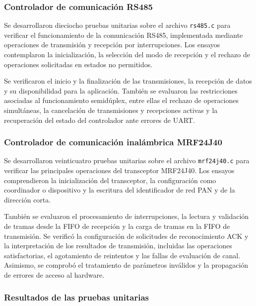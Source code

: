 \subsubsection{Controlador de comunicación RS485}

Se desarrollaron dieciocho pruebas unitarias sobre el archivo \texttt{rs485.c} para verificar el funcionamiento de la comunicación RS485, implementada mediante operaciones de transmisión y recepción por interrupciones. Los ensayos contemplaron la inicialización, la selección del modo de recepción y el rechazo de operaciones solicitadas en estados no permitidos.

Se verificaron el inicio y la finalización de las transmisiones, la recepción de datos y su disponibilidad para la aplicación. También se evaluaron las restricciones asociadas al funcionamiento semidúplex, entre ellas el rechazo de operaciones simultáneas, la cancelación de transmisiones y recepciones activas y la recuperación del estado del controlador ante errores de UART.

\subsubsection{Controlador de comunicación inalámbrica MRF24J40}

Se desarrollaron veinticuatro pruebas unitarias sobre el archivo \texttt{mrf24j40.c} para verificar las principales operaciones del transceptor MRF24J40. Los ensayos comprendieron la inicialización del transceptor, la configuración como coordinador o dispositivo y la escritura del identificador de red PAN y de la dirección corta.

También se evaluaron el procesamiento de interrupciones, la lectura y validación de tramas desde la FIFO de recepción y la carga de tramas en la FIFO de transmisión. Se verificó la configuración de solicitudes de reconocimiento ACK y la interpretación de los resultados de transmisión, incluidas las operaciones satisfactorias, el agotamiento de reintentos y las fallas de evaluación de canal. Asimismo, se comprobó el tratamiento de parámetros inválidos y la propagación de errores de acceso al hardware.

\subsubsection{Resultados de las pruebas unitarias}

